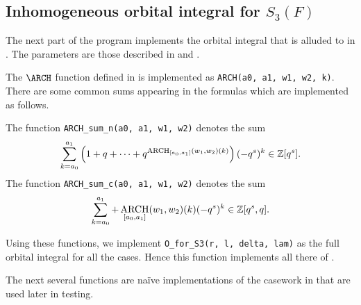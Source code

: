 \subsection{Inhomogeneous orbital integral for $S_3(F)$}
The next part of the program implements the orbital integral
that is alluded to in .
The parameters are those described in  and .
\begin{itemize}
  \ii The $\ARCH$ function defined in  is implemented
  as \texttt{ARCH(a0, a1, w1, w2, k)}.
  \ii There are some common sums appearing in the formulas
  which are implemented as follows.
  \begin{itemize}
    \ii The function \texttt{ARCH\_sum\_n(a0, a1, w1, w2)} denotes the sum
    \[ \sum_{k=a_0}^{a_1} \left( 1 + q + \dots
      + q^{\operatorname*{ARCH}_{[a_0, a_1]}(w_1, w_2)(k)} \right) (-q^s)^k \in \mathbb Z[q^s]. \]
    \ii The function \texttt{ARCH\_sum\_c(a0, a1, w1, w2)} denotes the sum
    \[ \sum_{k=a_0}^{a_1} + \operatorname*{ARCH}_{[a_0, a_1]}(w_1, w_2)(k) (-q^s)^k \in \mathbb Z[q^s, q]. \]
  \end{itemize}
  \ii Using these functions, we implement \texttt{O\_for\_S3(r, l, delta, lam)}
  as the full orbital integral for all the cases.
  Hence this function implements all there of
  .
\end{itemize}
The next several functions are na\"{i}ve implementations of the casework in
 that are used later in testing.
